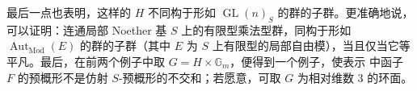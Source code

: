 最后一点也表明，这样的 \(H\) 不同构于形如 \(\operatorname{GL}(n)_S\) 的群的子群。更准确地说，可以证明：连通局部 Noether 基 \(S\) 上的有限型乘法型群，同构于形如 \(\operatorname{Aut}_{\mathrm{Mod}}(E)\) 的群的子群（其中 \(E\) 为 \(S\) 上有限型的局部自由模），当且仅当它等平凡。最后，在前两个例子中取 \(G=H\times\mathbb G_m\)，便得到一个例子，使表示  中函子 \(F\) 的预概形不是仿射 \(S\)-预概形的不交和；若愿意，可取 \(G\) 为相对维数 \(3\) 的环面。


